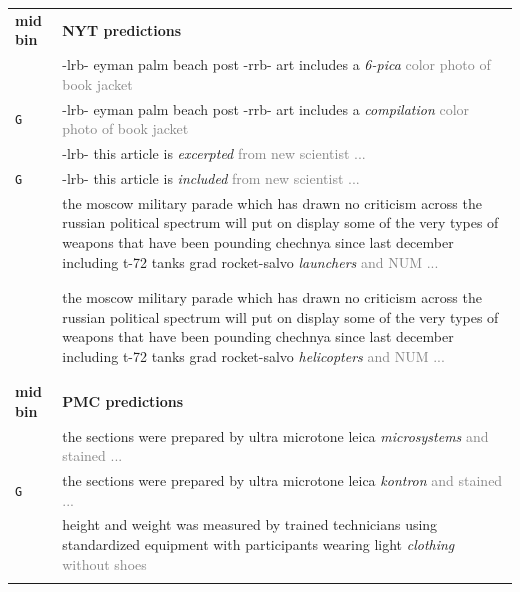 \documentclass[11pt,a4paper]{article}
\begin{document}
\begin{table}[t]
    \centering
\begin{tabularx}{\linewidth}{ll} 
\textbf{mid bin} & \textbf{NYT predictions}  \\ 
    \addlinespace[1ex]
    {\tt ctg} & -lrb- eyman palm beach post -rrb- art includes a \textit{6-pica} \textcolor{gray}{color photo of book jacket}\\
    {\tt G} & -lrb- eyman palm beach post -rrb- art includes a \textit{compilation} \textcolor{gray}{color photo of book jacket}\\
    \addlinespace[1ex]
   {\tt ctg} & -lrb- this article is \textit{excerpted} \textcolor{gray}{from new scientist ...} \\
   {\tt G} & -lrb- this article is \textit{included} \textcolor{gray}{from new scientist ...} \\
    \addlinespace[1ex]
    {\tt ctg} & \multirow{1}{*}{\parbox{13cm}{the moscow military parade which has drawn no criticism across the russian political spectrum will put on display some of the very types of weapons that have been pounding chechnya since last december including t-72 tanks grad rocket-salvo \textit{launchers} \textcolor{gray}{and NUM ...}}} \\ \\ \\
    \addlinespace[1ex]
    {\tt G} & \multirow{1}{*}{\parbox{13cm}{the moscow military parade which has drawn no criticism across the russian political spectrum will put on display some of the very types of weapons that have been pounding chechnya since last december including t-72 tanks grad rocket-salvo \textit{helicopters} \textcolor{gray}{and NUM ...}}} \\ \\ \\
    \addlinespace[1ex]
    \textbf{mid bin} & \textbf{PMC predictions}  \\
    \addlinespace[1ex]
    {\tt ctg} & the sections were prepared by ultra microtone leica \textit{microsystems} \textcolor{gray}{and stained ...} \\
    {\tt G} & the sections were prepared by ultra microtone leica \textit{kontron} \textcolor{gray}{and stained ...} \\
    \addlinespace[1ex]
    {\tt ctg} & \multirow{1}{*}{\parbox{13cm}{height and weight was measured by trained technicians using standardized equipment with participants wearing light \textit{clothing} \textcolor{gray}{without shoes}}} \\ \\

\end{tabularx}
\end{table}
\end{document}
